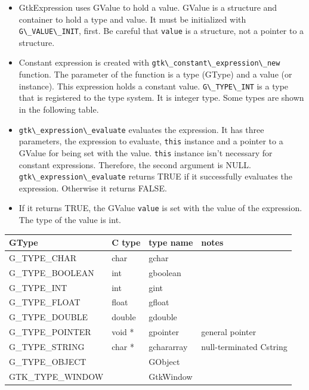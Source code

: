 \begin{itemize}
\tightlist
\item
  GtkExpression uses GValue to hold a value. GValue is a structure and
  container to hold a type and value. It must be initialized with
  \passthrough{\lstinline!G\_VALUE\_INIT!}, first. Be careful that
  \passthrough{\lstinline!value!} is a structure, not a pointer to a
  structure.
\item
  Constant expression is created with
  \passthrough{\lstinline!gtk\_constant\_expression\_new!} function. The
  parameter of the function is a type (GType) and a value (or instance).
  This expression holds a constant value.
  \passthrough{\lstinline!G\_TYPE\_INT!} is a type that is registered to
  the type system. It is integer type. Some types are shown in the
  following table.
\item
  \passthrough{\lstinline!gtk\_expression\_evaluate!} evaluates the
  expression. It has three parameters, the expression to evaluate,
  \passthrough{\lstinline!this!} instance and a pointer to a GValue for
  being set with the value. \passthrough{\lstinline!this!} instance
  isn't necessary for constant expressions. Therefore, the second
  argument is NULL. \passthrough{\lstinline!gtk\_expression\_evaluate!}
  returns TRUE if it successfully evaluates the expression. Otherwise it
  returns FALSE.
\item
  If it returns TRUE, the GValue \passthrough{\lstinline!value!} is set
  with the value of the expression. The type of the value is int.
\end{itemize}

\begin{longtable}[]{@{}llll@{}}
\toprule\noalign{}
GType & C type & type name & notes \\
\midrule\noalign{}
\endhead
\bottomrule\noalign{}
\endlastfoot
G\_TYPE\_CHAR & char & gchar & \\
G\_TYPE\_BOOLEAN & int & gboolean & \\
G\_TYPE\_INT & int & gint & \\
G\_TYPE\_FLOAT & float & gfloat & \\
G\_TYPE\_DOUBLE & double & gdouble & \\
G\_TYPE\_POINTER & void * & gpointer & general pointer \\
G\_TYPE\_STRING & char * & gchararray & null-terminated Cstring \\
G\_TYPE\_OBJECT & & GObject & \\
GTK\_TYPE\_WINDOW & & GtkWindow & \\
\end{longtable}

